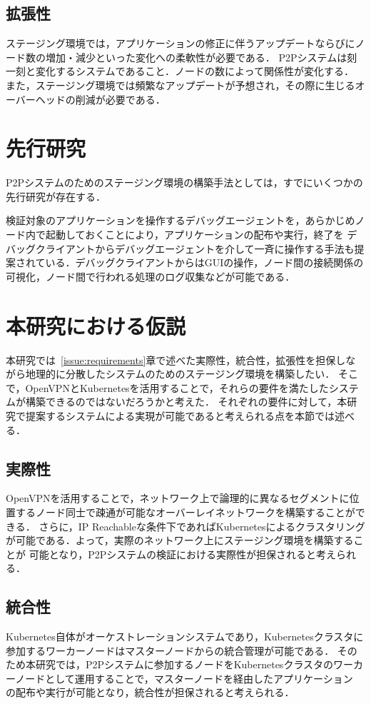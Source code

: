 \subsection{拡張性}
\label{issue:requirements3}
ステージング環境では，アプリケーションの修正に伴うアップデートならびにノード数の増加・減少といった変化への柔軟性が必要である．
P2Pシステムは刻一刻と変化するシステムであること．ノードの数によって関係性が変化する．
また，ステージング環境では頻繁なアップデートが予想され，その際に生じるオーバーヘッドの削減が必要である．

\section{先行研究}
\label{issue:previous-research}
P2Pシステムのためのステージング環境の構築手法としては，すでにいくつかの先行研究が存在する．

検証対象のアプリケーションを操作するデバッグエージェントを，あらかじめノード内で起動しておくことにより，アプリケーションの配布や実行，終了を
デバッグクライアントからデバッグエージェントを介して一斉に操作する手法も提案されている．デバッグクライアントからはGUIの操作，ノード間の接続関係の
可視化，ノード間で行われる処理のログ収集などが可能である．

\section{本研究における仮説}
\label{issue:hypothesis}
本研究では~\ref{issue:requirements}章で述べた実際性，統合性，拡張性を担保しながら地理的に分散したシステムのためのステージング環境を構築したい．
そこで，OpenVPNとKubernetesを活用することで，それらの要件を満たしたシステムが構築できるのではないだろうかと考えた．
それぞれの要件に対して，本研究で提案するシステムによる実現が可能であると考えられる点を本節では述べる．

\subsection{実際性}
OpenVPNを活用することで，ネットワーク上で論理的に異なるセグメントに位置するノード同士で疎通が可能なオーバーレイネットワークを構築することができる．
さらに，IP Reachableな条件下であればKubernetesによるクラスタリングが可能である．よって，実際のネットワーク上にステージング環境を構築することが
可能となり，P2Pシステムの検証における実際性が担保されると考えられる．

\subsection{統合性}
Kubernetes自体がオーケストレーションシステムであり，Kubernetesクラスタに参加するワーカーノードはマスターノードからの統合管理が可能である．
そのため本研究では，P2Pシステムに参加するノードをKubernetesクラスタのワーカーノードとして運用することで，マスターノードを経由したアプリケーション
の配布や実行が可能となり，統合性が担保されると考えられる．

